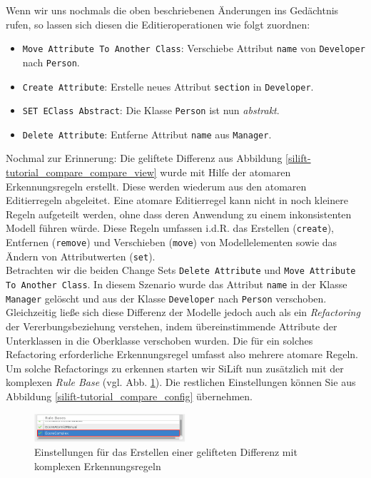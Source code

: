 \documentclass[a4paper]{scrartcl}
\begin{document}
Wenn wir uns nochmals die oben beschriebenen Änderungen ins Gedächtnis rufen, so lassen sich diesen die Editieroperationen wie folgt zuordnen:

\begin{itemize}
\item \texttt{Move Attribute To Another Class}: Verschiebe Attribut \texttt{name} von \texttt{Developer} nach \texttt{Person}.
\item \texttt{Create Attribute}: Erstelle neues Attribut \texttt{section} in \texttt{Developer}.
\item \texttt{SET EClass Abstract}: Die Klasse \texttt{Person} ist nun \textit{abstrakt}.
\item \texttt{Delete Attribute}: Entferne Attribut \texttt{name} aus \texttt{Manager}.
\end{itemize}

Nochmal zur Erinnerung: Die geliftete Differenz aus Abbildung \ref{silift-tutorial_compare_compare_view} wurde mit Hilfe der atomaren Erkennungsregeln erstellt.
Diese werden wiederum aus den atomaren Editierregeln abgeleitet.
Eine atomare Editierregel kann nicht in noch kleinere Regeln aufgeteilt werden, ohne dass deren Anwendung zu einem inkonsistenten Modell führen würde.
Diese Regeln umfassen i.d.R. das Erstellen (\texttt{create}), Entfernen (\texttt{remove}) und Verschieben (\texttt{move}) von Modellelementen sowie das Ändern von Attributwerten (\texttt{set}).\\
Betrachten wir die beiden Change Sets \texttt{Delete Attribute} und \texttt{Move Attribute To Another Class}.
In diesem Szenario wurde das Attribut \texttt{name} in der Klasse \texttt{Manager} gelöscht und aus der Klasse \texttt{Developer} nach \texttt{Person} verschoben.
Gleichzeitig ließe sich diese Differenz der Modelle jedoch auch als ein \textit{Refactoring} der Vererbungsbeziehung verstehen, indem übereinstimmende Attribute der Unterklassen in die Oberklasse verschoben wurden.
Die für ein solches Refactoring erforderliche Erkennungsregel umfasst also mehrere atomare Regeln.
Um solche Refactorings zu erkennen starten wir SiLift nun zusätzlich mit der komplexen \textit{Rule Base} (vgl. Abb. \ref{silift-tutorial_compare_config_complex}). Die restlichen Einstellungen können Sie aus Abbildung \ref{silift-tutorial_compare_config} übernehmen.

\begin{figure}[H]
\centering
\includegraphics[width=0.5\textwidth]{graphics/silift-tutorial_compare_config_complex.png}
\caption{Einstellungen für das Erstellen einer gelifteten Differenz mit komplexen Erkennungsregeln}
\label{silift-tutorial_compare_config_complex}
\end{figure}
\end{document}
